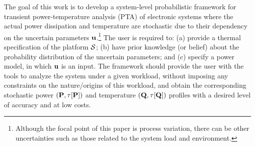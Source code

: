 The goal of this work is to develop a system-level probabilistic framework for transient power-temperature analysis (PTA) of electronic systems where the actual power dissipation and temperature are stochastic due to their dependency on the uncertain parameters $\mathbf{u}$.\footnote{Although the focal point of this paper is process variation, there can be other uncertainties such as those related to the system load and environment.}
The user is required to: (a) provide a thermal specification of the platform $\mathcal{S}$; (b) have prior knowledge (or belief) about the probability distribution of the uncertain parameters; and (c) specify a power model, in which $\mathbf{u}$ is an input.
The framework should provide the user with the tools to analyze the system under a given workload, without imposing any constraints on the nature/origins of this workload, and obtain the corresponding stochastic power $\profileP$ and temperature $\profileT$ profiles with a desired level of accuracy and at low costs.
